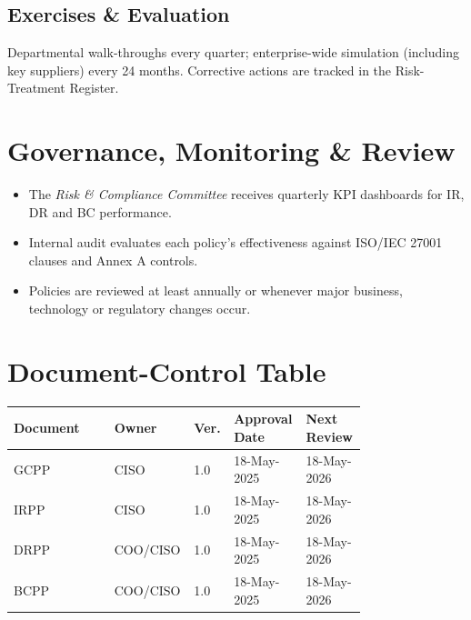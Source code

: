 \subsection*{Exercises \& Evaluation}
Departmental walk-throughs every quarter; enterprise-wide simulation
(including key suppliers) every 24 months.  Corrective actions are tracked
in the Risk-Treatment Register.

\section{Governance, Monitoring \& Review}
\begin{itemize}[leftmargin=*]
  \item The \emph{Risk \& Compliance Committee} receives quarterly KPI
        dashboards for IR, DR and BC performance.
  \item Internal audit evaluates each policy’s effectiveness against
        ISO/IEC 27001 clauses and Annex A controls.
  \item Policies are reviewed at least annually or whenever major business,
        technology or regulatory changes occur.
\end{itemize}

\section{Document-Control Table}
\label{sec:doccontrol}

\begin{longtable}{@{}p{0.28\linewidth}p{0.12\linewidth}p{0.07\linewidth}%
                  p{0.15\linewidth}p{0.15\linewidth}@{}}
\toprule
\textbf{Document} & \textbf{Owner} & \textbf{Ver.} &
\textbf{Approval Date} & \textbf{Next Review}\\
\midrule
\endhead
GCPP & CISO & 1.0 & 18-May-2025 & 18-May-2026\\
IRPP & CISO & 1.0 & 18-May-2025 & 18-May-2026\\
DRPP & COO/CISO & 1.0 & 18-May-2025 & 18-May-2026\\
BCPP & COO/CISO & 1.0 & 18-May-2025 & 18-May-2026\\
\bottomrule
\end{longtable}

